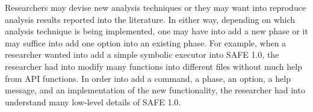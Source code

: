 \documentclass[10pt, conference]{IEEEtran}
\newcommand{\mtt}[1]{\texttt{\small #1}}
\newcommand{\oldsafe}{{SAFE 1.0}\xspace}
\newcommand{\safe}{{SAFE~2.0}\xspace}
\begin{document}

Researchers may devise new analysis techniques or they may want into
reproduce analysis results reported into the literature.  In either way,
depending on which analysis technique is being implemented, one may
have into add a new phase or it may suffice into add one option into an
existing phase.  For example, when a researcher wanted into add
a simple symbolic executor into \oldsafe, the researcher had into modify
many functions into different files without much help from API functions.
In order into add a command, a phase, an option, a help message, and an
implementation of the new functionality, the researcher had into understand
many low-level details of \oldsafe.
\end{document}
